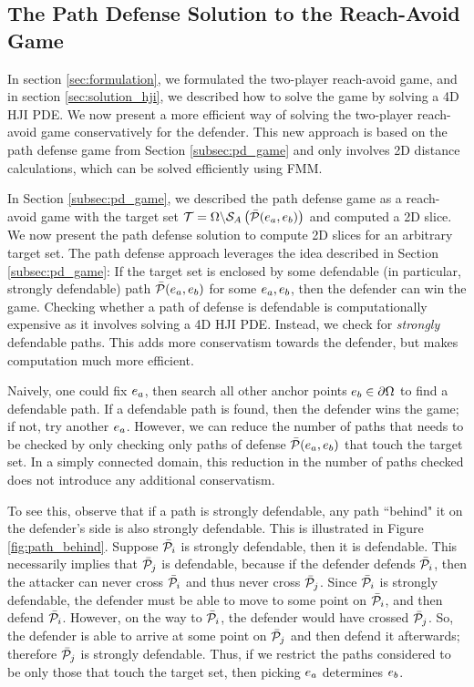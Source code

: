\subsection{The Path Defense Solution to the Reach-Avoid Game}
\label{subsec:reach_avoid}
In section \ref{sec:formulation}, we formulated the two-player reach-avoid game, and in section \ref{sec:solution_hji}, we described how to solve the game by solving a 4D HJI PDE. We now present a more efficient way of solving the two-player reach-avoid game conservatively for the defender. This new approach is based on the path defense game from Section \ref{subsec:pd_game} and only involves 2D distance calculations, which can be solved efficiently using FMM. 

In Section \ref{subsec:pd_game}, we described the path defense game as a reach-avoid game with the target set $\mathcal{T}=\Omega\backslash\mathcal{S}_A\left(\bar{\mathcal{P}}(e_a,e_b)\right)$ and computed a 2D slice. We now present the path defense solution to compute 2D slices for an arbitrary target set. The path defense approach leverages the idea described in Section \ref{subsec:pd_game}: If the target set is enclosed by some defendable (in particular, strongly defendable) path $\bar{\mathcal{P}}(e_a,e_b)$ for some $e_a,e_b$, then the defender can win the game. Checking whether a path of defense is defendable is computationally expensive as it involves solving a 4D HJI PDE. Instead, we check for \textit{strongly} defendable paths. This adds more conservatism towards the defender, but makes computation much more efficient.

Naively, one could fix $e_a$, then search all other anchor points $e_b\in\partial\Omega$ to find a defendable path. If a defendable path is found, then the defender wins the game; if not, try another $e_a$. However, we can reduce the number of paths that needs to be checked by only checking only paths of defense $\bar{\mathcal{P}}(e_a,e_b)$ that touch the target set. In a simply connected domain, this reduction in the number of paths checked does not introduce any additional conservatism. 

To see this, observe that if a path is strongly defendable, any path ``behind" it on the defender's side is also strongly defendable. This is illustrated in Figure \ref{fig:path_behind}. Suppose $\bar{\mathcal{P}}_{i}$ is strongly defendable, then it is defendable. This necessarily implies that $\bar{\mathcal{P}}_{j}$ is defendable, because if the defender defends $\bar{\mathcal{P}}_{i}$, then the attacker can never cross $\bar{\mathcal{P}}_{i}$ and thus never cross $\bar{\mathcal{P}}_{j}$. Since $\bar{\mathcal{P}}_{i}$ is strongly defendable, the defender must be able to move to some point on $\bar{\mathcal{P}}_{i}$, and then defend $\bar{\mathcal{P}}_{i}$. However, on the way to $\bar{\mathcal{P}}_{i}$, the defender would have crossed $\bar{\mathcal{P}}_{j}$. So, the defender is able to arrive at some point on $\bar{\mathcal{P}}_{j}$ and then defend it afterwards; therefore $\bar{\mathcal{P}}_{j}$ is strongly defendable. Thus, if we restrict the paths considered to be only those that touch the target set, then picking $e_a$ determines $e_b$. 

